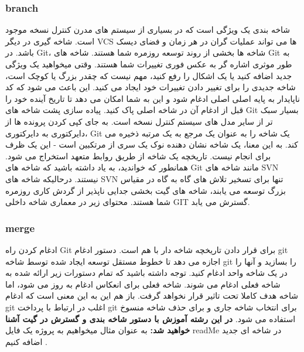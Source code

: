 \subsubsection{branch}
شاخه بندی یک ویژگی است که در بسیاری از سیستم های مدرن کنترل نسخه موجود است. شاخه گیری در دیگر VCS ها می تواند عملیات گران در هر زمان و فضای دیسک باشد. در Git، شاخه ها بخشی از روند توسعه روزمره شما هستند. شاخه های Git به طور موثری اشاره گر به عکس فوری تغییرات شما هستند. وقتی میخواهید یک ویژگی جدید اضافه کنید یا یک اشکال را رفع کنید، مهم نیست که چقدر بزرگ یا کوچک است، شاخه جدیدی را برای تغییر دادن تغییرات خود ایجاد می کنید. این باعث می شود که کد ناپایدار به پایه اصلی اصلی ادغام شود و این به شما امکان می دهد تا تاریخ آینده خود را قبل از ادغام آن در شاخه اصلی پاک کنید.
\newline
پیاده سازی پشت شاخه های Git بسیار سبک تر از سایر مدل های سیستم کنترل نسخه است. به جای کپی کردن پرونده ها از دایرکتوری به دایرکتوری، Git یک شاخه را به عنوان یک مرجع به یک مرتبه ذخیره می کند. به این معنا، یک شاخه نشان دهنده نوک یک سری از مرتکبین است - این یک ظرف برای انجام نیست. تاریخچه یک شاخه از طریق روابط متعهد استخراج می شود.
\newline
همانطور که خواندید، به یاد داشته باشید که شاخه های Git مانند شاخه های SVN نیستند. درحالیکه شاخه های SVN تنها برای تسخیر تلاش های گاه به گاه در مقیاس بزرگ توسعه می یابند، شاخه های گیت بخشی جدایی ناپذیر از گردش کاری روزمره شما هستند. محتوای زیر در معماری شاخه داخلی GIT گسترش می یابد.
\subsubsection{merge}
ادغام کردن راه Git برای قرار دادن تاریخچه شاخه دار با هم است. دستور ادغام git اجازه می دهد تا خطوط مستقل توسعه ایجاد شده توسط شاخه git را بسازید و آنها را در یک شاخه واحد ادغام کنید.
\newline
توجه داشته باشید که تمام دستورات زیر ارائه شده به شاخه فعلی ادغام می شوند. شاخه فعلی برای انعکاس ادغام به روز می شود، اما شاخه هدف کاملا تحت تاثیر قرار نخواهد گرفت. باز هم این به این معنی است که ادغام git اغلب در ارتباط با پرداخت git برای انتخاب شاخه جاری و  برای حذف شاخه منسوخ استفاده می شود.
\newline  \newline \newline
\textbf{در این رشته آموزش با دستور شاخه بندی و گسترش در گیت آشنا خواهید شد:}
\newline
\newline
به عنوان مثال میخواهیم به پروژه یک فایل readMe در شاخه ای جدید اضافه کنیم .
\newline

